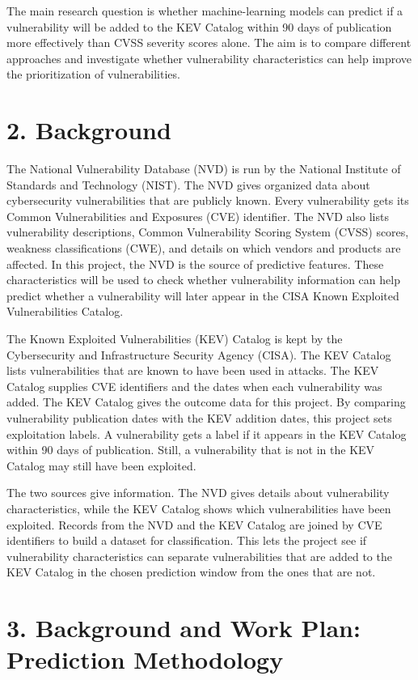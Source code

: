 \documentclass[11pt, a4paper]{article}
\begin{document}
	The main research question is whether machine-learning models can predict if a vulnerability will be added to the KEV Catalog within 90 days of publication more effectively than CVSS severity scores alone. The aim is to compare different approaches and investigate whether vulnerability characteristics can help improve the prioritization of vulnerabilities.
	
	\section*{2. Background}
	The National Vulnerability Database (NVD) is run by the National Institute of Standards and Technology (NIST). The NVD gives organized data about cybersecurity vulnerabilities that are publicly known. Every vulnerability gets its Common Vulnerabilities and Exposures (CVE) identifier. The NVD also lists vulnerability descriptions, Common Vulnerability Scoring System (CVSS) scores, weakness classifications (CWE), and details on which vendors and products are affected. In this project, the NVD is the source of predictive features. These characteristics will be used to check whether vulnerability information can help predict whether a vulnerability will later appear in the CISA Known Exploited Vulnerabilities Catalog.
	
	The Known Exploited Vulnerabilities (KEV) Catalog is kept by the Cybersecurity and Infrastructure Security Agency (CISA). The KEV Catalog lists vulnerabilities that are known to have been used in attacks. The KEV Catalog supplies CVE identifiers and the dates when each vulnerability was added. The KEV Catalog gives the outcome data for this project. By comparing vulnerability publication dates with the KEV addition dates, this project sets exploitation labels. A vulnerability gets a label if it appears in the KEV Catalog within 90 days of publication. Still, a vulnerability that is not in the KEV Catalog may still have been exploited.
	
	The two sources give information. The NVD gives details about vulnerability characteristics, while the KEV Catalog shows which vulnerabilities have been exploited. Records from the NVD and the KEV Catalog are joined by CVE identifiers to build a dataset for classification. This lets the project see if vulnerability characteristics can separate vulnerabilities that are added to the KEV Catalog in the chosen prediction window from the ones that are not.
	
	\section*{3. Background and Work Plan: Prediction Methodology}
	
\end{document}
